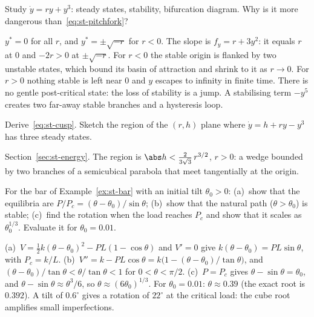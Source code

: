 \label{exo:st-subcritical}
%
Study $\dot y = ry + y^3$: steady states, stability, bifurcation diagram. Why is
it more dangerous than~\eqref{eq:st-pitchfork}?
\begin{solution}
$y^* = 0$ for all $r$, and $y^* = \pm\sqrt{-r}$ for $r < 0$. The slope is
$f_y = r + 3y^2$: it equals $r$ at $0$ and $-2r > 0$ at $\pm\sqrt{-r}$. For $r < 0$
the stable origin is flanked by two unstable states, which bound its basin of
attraction and shrink to it as $r \to 0$. For $r > 0$ nothing stable is left near
$0$ and $y$ escapes to infinity in finite time. There is no gentle post-critical
state: the loss of stability is a jump. A stabilising term $-y^5$ creates two
far-away stable branches and a hysteresis loop.
\end{solution}

\label{exo:st-cusp}
%
Derive~\eqref{eq:st-cusp}. Sketch the region of the $(r,h)$ plane where
$\dot y = h + ry - y^3$ has three steady states.
\begin{solution}
Section~\ref{sec:st-energy}. The region is
$\abs h < \tfrac{2}{3\sqrt3}\,r^{3/2}$, $r > 0$: a wedge bounded by two branches
of a semicubical parabola that meet tangentially at the origin.
\end{solution}

\label{exo:st-imperfect-bar}
%
%
For the bar of Example~\ref{ex:st-bar} with an initial tilt $\theta_0 > 0$:
(a)~show that the equilibria are $P/P_c = (\theta - \theta_0)/\sin\theta$;
(b)~show that the natural path ($\theta > \theta_0$) is stable;
(c)~find the rotation when the load reaches $P_c$ and show that it scales as
$\theta_0^{1/3}$. Evaluate it for $\theta_0 = 0.01$.
\begin{solution}
(a)~$V = \tfrac12 k(\theta - \theta_0)^2 - PL(1 - \cos\theta)$ and $V' = 0$ give
$k(\theta - \theta_0) = PL\sin\theta$, with $P_c = k/L$.
(b)~$V'' = k - PL\cos\theta = k\bigl(1 - (\theta - \theta_0)/\tan\theta\bigr)$, and
$(\theta - \theta_0)/\tan\theta < \theta/\tan\theta < 1$ for $0 < \theta < \pi/2$.
(c)~$P = P_c$ gives $\theta - \sin\theta = \theta_0$, and
$\theta - \sin\theta \approx \theta^3/6$, so $\theta \approx (6\theta_0)^{1/3}$. For
$\theta_0 = 0.01$: $\theta \approx 0.39$ (the exact root is $0.392$). A tilt of
$0.6^\circ$ gives a rotation of $22^\circ$ at the critical load: the cube root
amplifies small imperfections.
\end{solution}

